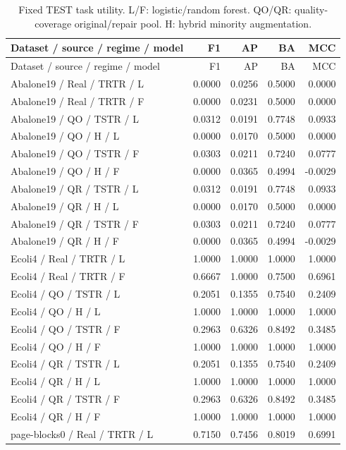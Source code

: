 \begin{longtable}{lrrrr}
\caption{Fixed TEST task utility. L/F: logistic/random forest. QO/QR: quality-coverage original/repair pool. H: hybrid minority augmentation.}\label{tab:utility}\\
\toprule
Dataset / source / regime / model & F1 & AP & BA & MCC \\
\midrule
\endfirsthead
\toprule
Dataset / source / regime / model & F1 & AP & BA & MCC \\
\midrule
\endhead
Abalone19 / Real / TRTR / L & 0.0000 & 0.0256 & 0.5000 & 0.0000 \\
Abalone19 / Real / TRTR / F & 0.0000 & 0.0231 & 0.5000 & 0.0000 \\
Abalone19 / QO / TSTR / L & 0.0312 & 0.0191 & 0.7748 & 0.0933 \\
Abalone19 / QO / H / L & 0.0000 & 0.0170 & 0.5000 & 0.0000 \\
Abalone19 / QO / TSTR / F & 0.0303 & 0.0211 & 0.7240 & 0.0777 \\
Abalone19 / QO / H / F & 0.0000 & 0.0365 & 0.4994 & -0.0029 \\
Abalone19 / QR / TSTR / L & 0.0312 & 0.0191 & 0.7748 & 0.0933 \\
Abalone19 / QR / H / L & 0.0000 & 0.0170 & 0.5000 & 0.0000 \\
Abalone19 / QR / TSTR / F & 0.0303 & 0.0211 & 0.7240 & 0.0777 \\
Abalone19 / QR / H / F & 0.0000 & 0.0365 & 0.4994 & -0.0029 \\
Ecoli4 / Real / TRTR / L & 1.0000 & 1.0000 & 1.0000 & 1.0000 \\
Ecoli4 / Real / TRTR / F & 0.6667 & 1.0000 & 0.7500 & 0.6961 \\
Ecoli4 / QO / TSTR / L & 0.2051 & 0.1355 & 0.7540 & 0.2409 \\
Ecoli4 / QO / H / L & 1.0000 & 1.0000 & 1.0000 & 1.0000 \\
Ecoli4 / QO / TSTR / F & 0.2963 & 0.6326 & 0.8492 & 0.3485 \\
Ecoli4 / QO / H / F & 1.0000 & 1.0000 & 1.0000 & 1.0000 \\
Ecoli4 / QR / TSTR / L & 0.2051 & 0.1355 & 0.7540 & 0.2409 \\
Ecoli4 / QR / H / L & 1.0000 & 1.0000 & 1.0000 & 1.0000 \\
Ecoli4 / QR / TSTR / F & 0.2963 & 0.6326 & 0.8492 & 0.3485 \\
Ecoli4 / QR / H / F & 1.0000 & 1.0000 & 1.0000 & 1.0000 \\
page-blocks0 / Real / TRTR / L & 0.7150 & 0.7456 & 0.8019 & 0.6991 \\

\end{longtable}
